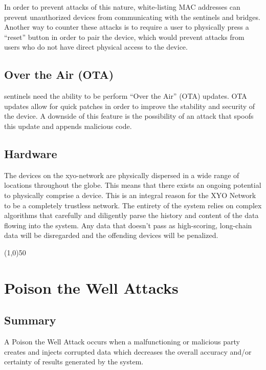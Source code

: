 \documentclass{article}
\begin{document}
In order to prevent attacks of this nature, white-listing MAC addresses can prevent unauthorized devices from communicating with the \Glspl{sentinel} and \Glspl{bridge}. Another way to counter these attacks is to require a user to physically press a ``reset'' button in order to pair the device, which would prevent attacks from users who do not have direct physical access to the device. 

\subsection{Over the Air (OTA)}
\Glspl{sentinel} need the ability to be perform ``Over the Air'' (OTA) updates. OTA updates allow for quick patches in order to improve the stability and security of the device. A downside of this feature is the possibility of an attack that spoofs this update and appends malicious code. 


\subsection{Hardware}
The devices on the \Gls{xyo-network} are physically dispersed in a wide range of locations throughout the globe. This means that there exists an ongoing potential to physically comprise a device. This is an integral reason for the XYO Network to be a completely \gls{trustless} network. The entirety of the system relies on complex algorithms that carefully and diligently parse the history and content of the data flowing into the system. Any data that doesn't pass as high-scoring, long-chain data will be disregarded and the offending devices will be penalized. 

\begin{center}
\line(1,0){50}
\end{center}

\section{Poison the Well Attacks}
\subsection{Summary}
A Poison the Well Attack occurs when a malfunctioning or malicious party creates and injects corrupted data which decreases the overall \gls{accuracy} and/or \gls{certainty} of results generated by the system.
\end{document}
